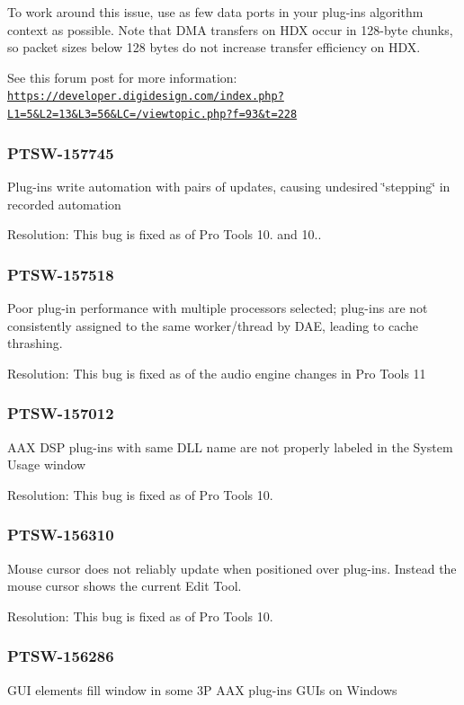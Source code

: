 To work around this issue, use as few data ports in your plug-\/in\textquotesingle{}s algorithm context as possible. Note that D\+M\+A transfers on H\+D\+X occur in 128-\/byte chunks, so packet sizes below 128 bytes do not increase transfer efficiency on H\+D\+X.

See this forum post for more information\+: \href{https://developer.digidesign.com/index.php?L1=5&L2=13&L3=56&LC=/viewtopic.php?f=93&t=228}{\tt https\+://developer.\+digidesign.\+com/index.\+php?\+L1=5\&\+L2=13\&\+L3=56\&\+L\+C=/viewtopic.\+php?f=93\&t=228}\hypertarget{a00374_PTSW-157745}{}\subsubsection{P\+T\+S\+W-\/157745}\label{a00374_PTSW-157745}
Plug-\/ins write automation with pairs of updates, causing undesired \char`\"{}stepping\char`\"{} in recorded automation

Resolution\+: This bug is fixed as of Pro Tools 10. and 10..\hypertarget{a00374_PTSW-157518}{}\subsubsection{P\+T\+S\+W-\/157518}\label{a00374_PTSW-157518}
Poor plug-\/in performance with multiple processors selected; plug-\/ins are not consistently assigned to the same worker/thread by D\+A\+E, leading to cache thrashing.

Resolution\+: This bug is fixed as of the audio engine changes in Pro Tools 11\hypertarget{a00374_PTSW-157012}{}\subsubsection{P\+T\+S\+W-\/157012}\label{a00374_PTSW-157012}
A\+A\+X D\+S\+P plug-\/ins with same D\+L\+L name are not properly labeled in the System Usage window

Resolution\+: This bug is fixed as of Pro Tools 10.\hypertarget{a00374_PTSW-156310}{}\subsubsection{P\+T\+S\+W-\/156310}\label{a00374_PTSW-156310}
Mouse cursor does not reliably update when positioned over plug-\/ins. Instead the mouse cursor shows the current Edit Tool.

Resolution\+: This bug is fixed as of Pro Tools 10.\hypertarget{a00374_PTSW-156286}{}\subsubsection{P\+T\+S\+W-\/156286}\label{a00374_PTSW-156286}
G\+U\+I elements fill window in some 3\+P A\+A\+X plug-\/ins G\+U\+Is on Windows

